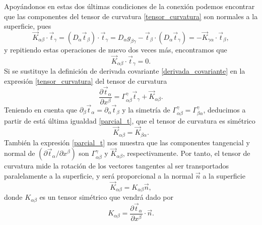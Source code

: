 Apoyándonos en estas dos últimas condiciones de la conexión podemos encontrar que
las componentes del tensor de curvatura \eqref{tensor_curvatura} son normales
a la superficie, pues
\begin{equation*}
\vec{K}_{\alpha\beta}\cdot \vec{t}_{\gamma}=(D_{\alpha}\vec{t}_{\beta})\cdot\vec{t}_{\gamma}=D_{\alpha}g_{\beta\gamma}-\vec{t}_{\beta}\cdot(D_{\alpha}\vec{t}_{\gamma})=-\vec{K}_{\gamma\alpha}\cdot \vec{t}_{\beta},
\end{equation*}
y repitiendo estas operaciones de nuevo dos veces más, encontramos que
\begin{equation*}
\vec{K}_{\alpha\beta}\cdot \vec{t}_{\gamma}=0.
\end{equation*}
Si se sustituye la definición de derivada covariante \eqref{derivada_covariante} en la expresión
\eqref{tensor_curvatura} del tensor de curvatura 
\begin{equation}\label{parcial_t}
\frac{\partial \vec{t}_{\alpha}}{\partial x^{\beta}}=\Gamma^{\gamma}_{\alpha\beta}\vec{t}_{\gamma}+\vec{K}_{\alpha\beta}.
\end{equation}
Teniendo en cuenta que $\partial_{\beta} \vec{t}_{\alpha}=\partial_{\alpha}
\vec{t}_{\beta}$  y la simetría de
$\Gamma^{\gamma}_{\alpha\beta}=\Gamma^{\gamma}_{\beta\alpha}$, deducimos a
partir de está última igualdad \eqref{parcial_t}, que el tensor de curvatura es simétrico 
\begin{equation*}
\vec{K}_{\alpha\beta}=\vec{K}_{\beta\alpha}.
\end{equation*}
También la expresión \eqref{parcial_t} nos muestra que las componentes
tangencial y normal de
$(\partial \vec{t}_{\alpha}/\partial x^{\beta})$ son $\Gamma^{\gamma}_{\alpha\beta}$  y 
$\vec{K}_{\alpha\beta}$, respectivamente. Por tanto, el tensor de curvatura
mide la rotación de los vectores tangentes al ser transportados paralelamente
a la superficie, y será proporcional a la normal $\vec{n}$ a la superficie
\begin{equation*}
 \vec{K}_{\alpha\beta}=K_{\alpha\beta}\vec{n},
\end{equation*}
donde $K_{\alpha\beta}$ es un tensor simétrico que vendrá dado por
\begin{equation}\label{K_alfa_beta}
K_{\alpha\beta}=\frac{\partial \vec{t}_{\alpha}}{\partial x^{\beta}}\cdot\vec{n}. 
\end{equation}

